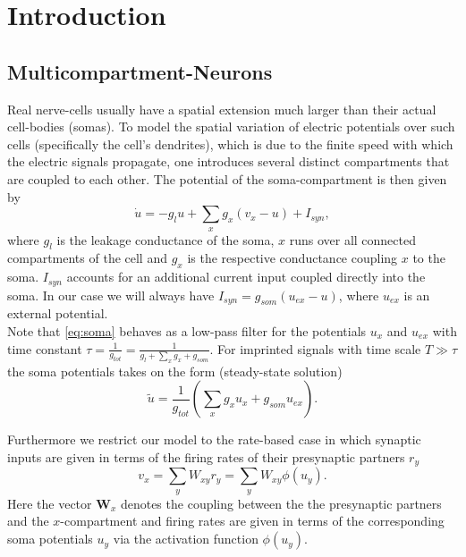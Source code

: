 \documentclass[12pt,a4paper]{article}
\begin{document}
\section{Introduction}
\subsection{Multicompartment-Neurons}
Real nerve-cells usually have a spatial extension much larger than their actual cell-bodies (somas). To model the spatial variation of electric potentials over such cells (specifically the cell's dendrites), which is due to the finite speed with which the electric signals propagate, one introduces several distinct compartments that are coupled to each other. The potential of the soma-compartment is then given by
\begin{equation}
\dot{u} = -g_lu + \sum_xg_x(v_x-u) + I_{syn}, \label{eq:soma}
\end{equation}  
where $g_l$ is the leakage conductance of the soma, $x$ runs over all connected compartments of the cell and $g_x$ is the respective conductance coupling $x$ to the soma. $I_{syn}$ accounts for an additional current input coupled directly into the soma. In our case we will always have $I_{syn} = g_{som}(u_{ex}-u)$, where $u_{ex}$ is an external potential.\\
Note that \eqref{eq:soma} behaves as a low-pass filter for the potentials $u_x$ and $u_{ex}$ with time constant $\tau = \frac{1}{g_{tot}} = \frac{1}{g_l + \sum_x g_x + g_{som}}$. For imprinted signals with time scale $T\gg\tau$ the soma potentials takes on the form (steady-state solution)
\begin{equation}
\tilde{u} = \frac{1}{g_{tot}}\left(\sum_x g_xu_x + g_{som}u_{ex}\right). \label{eq:steady}
\end{equation}

Furthermore we restrict our model to the rate-based case in which synaptic inputs are given in terms of the firing rates of their presynaptic partners $r_y$
\begin{equation}
v_x = \sum_yW_{xy}r_y = \sum_yW_{xy}\phi(u_y).
\end{equation}
Here the vector $\bm{W}_x$ denotes the coupling between the the presynaptic partners and the $x$-compartment and firing rates are given in terms of the corresponding soma potentials $u_y$ via the activation function $\phi(u_y)$.
\end{document}
